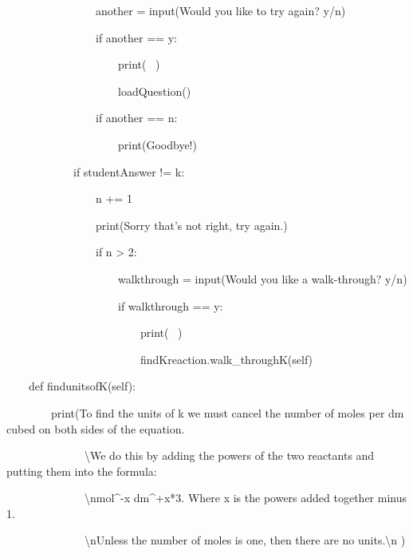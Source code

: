 \documentclass{article}
\begin{document}
\ \ \ \ \ \ \ \ \ \ \ \ \ \ \ \ another = input({\textquotedbl}Would you like to try again? y/n{\textquotedbl})

\ \ \ \ \ \ \ \ \ \ \ \ \ \ \ \ if another == {\textquotedbl}y{\textquotedbl}:

\ \ \ \ \ \ \ \ \ \ \ \ \ \ \ \ \ \ \ \ print({\textquotedbl} \ {\textquotedbl})

\ \ \ \ \ \ \ \ \ \ \ \ \ \ \ \ \ \ \ \ loadQuestion()

\ \ \ \ \ \ \ \ \ \ \ \ \ \ \ \ if another == {\textquotedbl}n{\textquotedbl}:

\ \ \ \ \ \ \ \ \ \ \ \ \ \ \ \ \ \ \ \ print({\textquotedbl}Goodbye!{\textquotedbl})

\ \ \ \ \ \ \ \ \ \ \ \ if studentAnswer != k:

\ \ \ \ \ \ \ \ \ \ \ \ \ \ \ \ n += 1

\ \ \ \ \ \ \ \ \ \ \ \ \ \ \ \ print({\textquotedbl}Sorry that's not right, try again.{\textquotedbl})

\ \ \ \ \ \ \ \ \ \ \ \ \ \ \ \ if n {\textgreater} 2:

\ \ \ \ \ \ \ \ \ \ \ \ \ \ \ \ \ \ \ \ walkthrough = input({\textquotedbl}Would you like a walk-through? y/n{\textquotedbl})

\ \ \ \ \ \ \ \ \ \ \ \ \ \ \ \ \ \ \ \ if walkthrough == {\textquotedbl}y{\textquotedbl}:

\ \ \ \ \ \ \ \ \ \ \ \ \ \ \ \ \ \ \ \ \ \ \ \ print({\textquotedbl} \ {\textquotedbl})

\ \ \ \ \ \ \ \ \ \ \ \ \ \ \ \ \ \ \ \ \ \ \ \ findKreaction.walk\_throughK(self)


\bigskip


\bigskip


\bigskip


\bigskip

\ \ \ \ def findunitsofK(self):

\ \ \ \ \ \ \ \ print({\textquotedbl}To find the units of k we must cancel the number of moles per dm cubed on both sides of the equation. {\textquotedbl}

\ \ \ \ \ \ \ \ \ \ \ \ \ \ {\textquotedbl}{\textbackslash}We do this by adding the powers of the two reactants and putting them into the formula: {\textquotedbl}

\ \ \ \ \ \ \ \ \ \ \ \ \ \ {\textquotedbl}{\textbackslash}nmol\^{}-x dm\^{}+x*3. Where x is the powers added together minus 1.{\textquotedbl}

\ \ \ \ \ \ \ \ \ \ \ \ \ \ {\textquotedbl}{\textbackslash}nUnless the number of moles is one, then there are no units.{\textbackslash}n {\textquotedbl})
\end{document}
